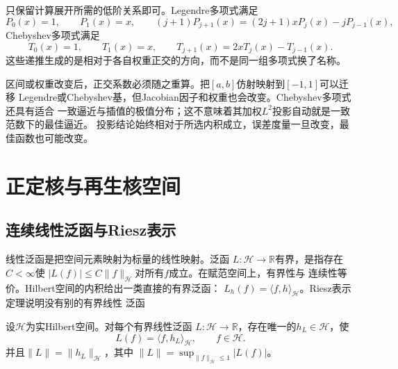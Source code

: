 只保留计算展开所需的低阶关系即可。Legendre多项式满足
\[
  P_0(x)=1,\qquad P_1(x)=x,\qquad
  (j+1)P_{j+1}(x)=(2j+1)xP_j(x)-jP_{j-1}(x),
\]
Chebyshev多项式满足
\[
  T_0(x)=1,\qquad T_1(x)=x,\qquad
  T_{j+1}(x)=2xT_j(x)-T_{j-1}(x).
\]
这些递推生成的是相对于各自权重正交的方向，而不是同一组多项式换了名称。

区间或权重改变后，正交系数必须随之重算。把$[a,b]$仿射映射到$[-1,1]$可以迁移
Legendre或Chebyshev基，但Jacobian因子和权重也会改变。Chebyshev多项式还具有适合
一致逼近与插值的极值分布；这不意味着其加权$L^2$投影自动就是一致范数下的最佳逼近。
投影结论始终相对于所选内积成立，误差度量一旦改变，最佳函数也可能改变。

\section{正定核与再生核空间}
\label{sec:functional-positive-kernels-rkhs}

\subsection{连续线性泛函与Riesz表示}

线性泛函是把空间元素映射为标量的线性映射。泛函
$L:\mathcal{H}\to\mathbb{R}$有界，是指存在$C<\infty$使
$|L(f)|\leq C\lVert f\rVert_{\mathcal{H}}$对所有$f$成立。在赋范空间上，有界性与
连续性等价。Hilbert空间的内积给出一类直接的有界泛函：
$L_h(f)=\langle f,h\rangle_{\mathcal{H}}$。Riesz表示定理说明没有别的有界线性
泛函

\begin{theorem}[Riesz表示定理]
\label{thm:functional-riesz-representation}
设$\mathcal{H}$为实Hilbert空间。对每个有界线性泛函
$L:\mathcal{H}\to\mathbb{R}$，存在唯一的$h_L\in\mathcal{H}$，使
\begin{equation}
  L(f)=\langle f,h_L\rangle_{\mathcal{H}},
  \qquad f\in\mathcal{H}.
  \label{eq:functional-riesz-representation}
\end{equation}
并且$\lVert L\rVert=\lVert h_L\rVert_{\mathcal{H}}$，其中
$\lVert L\rVert=\sup_{\lVert f\rVert_{\mathcal{H}}\leq1}|L(f)|$。
\end{theorem}

